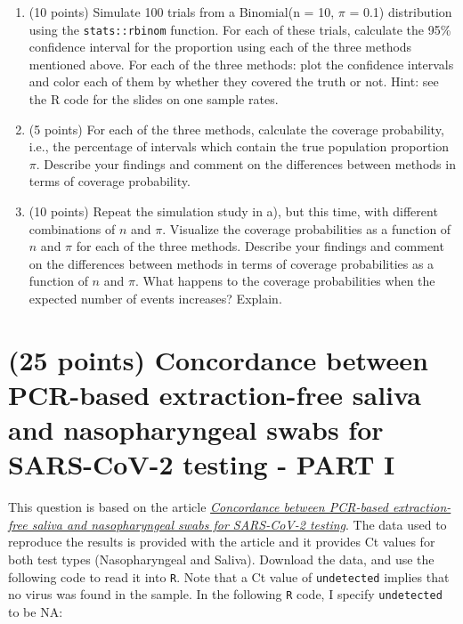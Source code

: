 \documentclass[letterpaper,12pt,twoside,]{pinp}
\begin{document}
\begin{enumerate}
\def\labelenumi{\alph{enumi})}
\item
  (10 points) Simulate 100 trials from a Binomial(n = 10, \(\pi\) = 0.1)
  distribution using the \texttt{stats::rbinom} function. For each of
  these trials, calculate the 95\% confidence interval for the
  proportion using each of the three methods mentioned above. For each
  of the three methods: plot the confidence intervals and color each of
  them by whether they covered the truth or not. Hint: see the R code
  for the slides on one sample rates.
\item
  (5 points) For each of the three methods, calculate the coverage
  probability, i.e., the percentage of intervals which contain the true
  population proportion \(\pi\). Describe your findings and comment on
  the differences between methods in terms of coverage probability.
\item
  (10 points) Repeat the simulation study in a), but this time, with
  different combinations of \(n\) and \(\pi\). Visualize the coverage
  probabilities as a function of \(n\) and \(\pi\) for each of the three
  methods. Describe your findings and comment on the differences between
  methods in terms of coverage probabilities as a function of \(n\) and
  \(\pi\). What happens to the coverage probabilities when the expected
  number of events increases? Explain.
\end{enumerate}

\hypertarget{points-concordance-between-pcr-based-extraction-free-saliva-and-nasopharyngeal-swabs-for-sars-cov-2-testing---part-i}{%
\section{(25 points) Concordance between PCR-based extraction-free
saliva and nasopharyngeal swabs for SARS-CoV-2 testing - PART
I}\label{points-concordance-between-pcr-based-extraction-free-saliva-and-nasopharyngeal-swabs-for-sars-cov-2-testing---part-i}}

This question is based on the article
\href{https://hrbopenresearch.org/articles/4-85/v2}{\emph{Concordance
between PCR-based extraction-free saliva and nasopharyngeal swabs for
SARS-CoV-2 testing}}. The data used to reproduce the results is provided
with the article and it provides Ct values for both test types
(Nasopharyngeal and Saliva). Download the data, and use the following
code to read it into \texttt{R}. Note that a Ct value of
\texttt{undetected} implies that no virus was found in the sample. In
the following \texttt{R} code, I specify \texttt{undetected} to be NA:
\end{document}
